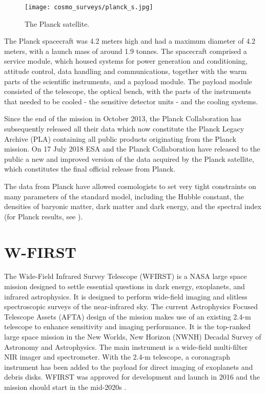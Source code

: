 \begin{figure}[htb]
    \centering
    \texttt{[image: cosmo\_surveys/planck\_s.jpg]}
    \caption{The Planck satellite.}
    \label{fig:planck}
\end{figure}
The Planck spacecraft was 4.2 meters high and had a maximum diameter of 4.2 meters, with a launch mass of around 1.9 tonnes. The spacecraft comprised a service module, which housed systems for power generation and conditioning, attitude control, data handling and communications, together with the warm parts of the scientific instruments, and a payload module. The payload module consisted of the telescope, the optical bench, with the parts of the instruments that needed to be cooled - the sensitive detector units - and the cooling systems.

Since the end of the mission in October 2013, the Planck Collaboration has subsequently released all their data which now constitute the Planck Legacy Archive (PLA) containing all public products originating from the Planck mission. On 17 July 2018 ESA and the Planck Collaboration have released to the public a new and improved version of the data acquired by the Planck satellite, which constitutes the final official release from Planck.

The data from Planck have allowed cosmologists to set very tight constraints on many parameters of the standard model, including the Hubble constant, the densities of baryonic matter, dark matter and dark energy, and the spectral index (for Planck results, see \cite{planck_cosm}).
\section{W-FIRST}
The Wide-Field Infrared Survey Telescope (WFIRST) is a NASA large space mission designed to settle essential questions in dark energy, exoplanets, and infrared astrophysics. It is designed to perform wide-field imaging and slitless spectroscopic surveys of the near-infrared sky. The current Astrophysics Focused Telescope Assets (AFTA) design of the mission makes use of an existing 2.4-m telescope to enhance sensitivity and imaging performance. It is the top-ranked large space mission in the New Worlds, New Horizon (NWNH) Decadal Survey of Astronomy and Astrophysics. The main instrument is a wide-field multi-filter NIR imager and spectrometer. With the 2.4-m telescope, a coronagraph instrument has been added to the payload for direct imaging of exoplanets and debris disks. WFIRST was approved for development and launch in 2016 and the mission should start in the mid-2020s \cite{WFIRST_report}.

